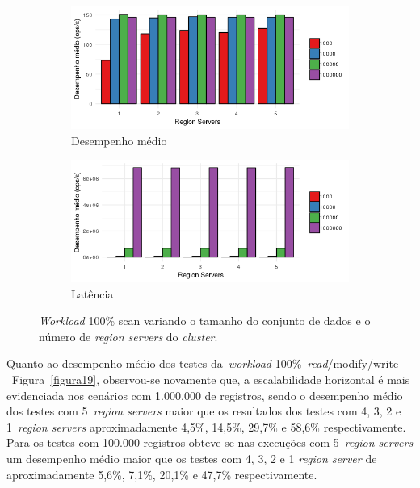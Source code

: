 \documentclass[12pt]{article}
\begin{document}
\begin{figure}
    \centering
    \begin{subfigure}[b]{0.49\textwidth}   
        \centering 
        \includegraphics[width=\textwidth]{images/figura21}
        \caption{Desempenho médio}
        \label{figura21}
    \end{subfigure}
    \begin{subfigure}[b]{0.49\textwidth}   
        \centering 
        \includegraphics[width=\textwidth]{images/figura22}
        \caption{Latência}
        \label{figura22}
    \end{subfigure}
    \caption{\emph{Workload} 100\% scan variando o tamanho do conjunto de dados e o número de \emph{region servers} do \emph{cluster}.}
\end{figure}

Quanto ao desempenho médio dos testes da~\emph{workload} 100\%~\emph{read}/modify/write~--~Figura~\ref{figura19}, observou-se novamente que, a escalabilidade horizontal é mais evidenciada nos cenários com 1.000.000 de registros, sendo o desempenho médio dos testes com 5~\emph{region servers} maior que os resultados dos testes com 4, 3, 2 e 1~\emph{region servers} aproximadamente 4,5\%, 14,5\%, 29,7\% e 58,6\% respectivamente. 
Para os testes com 100.000 registros obteve-se nas execuções com 5~\emph{region servers} um desempenho médio maior que os testes com 4, 3, 2 e 1 \emph{region server} de aproximadamente 5,6\%, 7,1\%, 20,1\% e 47,7\% respectivamente.
\end{document}
